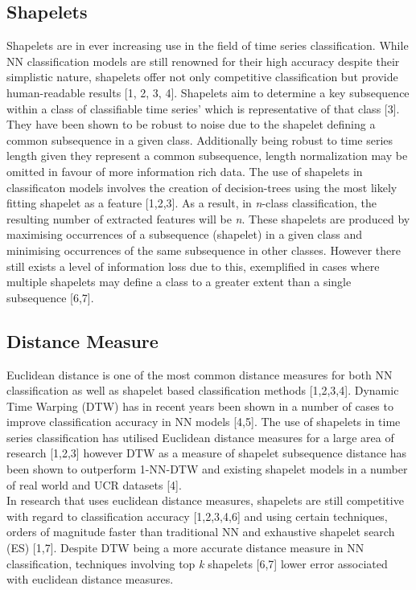 \documentclass[10pt,a4paper]{article}
\begin{document}
\subsection{Shapelets}
Shapelets are in ever increasing use in the field of time series classification.
While NN classification models are still renowned for their high accuracy despite their simplistic nature, shapelets offer not only competitive classification but provide human-readable results [1, 2, 3, 4]. 
Shapelets aim to determine a key subsequence within a class of classifiable time series' which is representative of that class [3].
They have been shown to be robust to noise due to the shapelet defining a common subsequence in a given class.
Additionally being robust to time series length given they represent a common subsequence, length normalization may be omitted in favour of more information rich data.
The use of shapelets in classificaton models involves the creation of decision-trees using  the most likely fitting shapelet as a feature [1,2,3].
As a result, in \textit{n}-class classification, the resulting number of extracted features will be \textit{n}.
These shapelets are produced by maximising occurrences of a subsequence (shapelet) in a given class and minimising occurrences of the same subsequence in other classes.
However there still exists a level of information loss due to this, exemplified in cases where multiple shapelets may define a class to a greater extent than a single subsequence [6,7].
\\

\subsection{Distance Measure}
Euclidean distance is one of the most common distance measures for both NN classification as well as shapelet based classification methods [1,2,3,4].
Dynamic Time Warping (DTW) has in recent years been shown in a number of cases to improve classification accuracy in NN models [4,5].
The use of shapelets in time series classification has utilised Euclidean distance measures for a large area of research [1,2,3] however DTW as a measure of shapelet subsequence distance has been shown to outperform 1-NN-DTW and existing shapelet models in a number of real world and UCR datasets [4].
\\
In research that uses euclidean distance measures, shapelets are still competitive with regard to classification accuracy [1,2,3,4,6] and using certain techniques, orders of magnitude faster than traditional NN and exhaustive shapelet search (ES) [1,7].
Despite DTW being a more accurate distance measure in NN classification, techniques involving top \textit{k} shapelets [6,7] lower error associated with euclidean distance measures.
 
\end{document}
